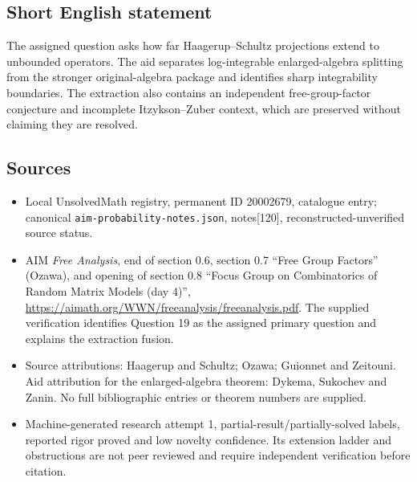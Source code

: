 \documentclass[11pt]{article}
\begin{document}
\subsection{Short English statement}
The assigned question asks how far Haagerup--Schultz projections extend to unbounded operators. The aid separates log-integrable enlarged-algebra splitting from the stronger original-algebra package and identifies sharp integrability boundaries. The extraction also contains an independent free-group-factor conjecture and incomplete Itzykson--Zuber context, which are preserved without claiming they are resolved.
\subsection{Sources}
\begin{itemize}
\item Local UnsolvedMath registry, permanent ID 20002679, catalogue entry; canonical \texttt{aim-probability-notes.json}, notes[120], reconstructed-unverified source status.
\item AIM \emph{Free Analysis}, end of section 0.6, section 0.7 ``Free Group Factors'' (Ozawa), and opening of section 0.8 ``Focus Group on Combinatorics of Random Matrix Models (day 4)'', \url{https://aimath.org/WWN/freeanalysis/freeanalysis.pdf}. The supplied verification identifies Question 19 as the assigned primary question and explains the extraction fusion.
\item Source attributions: Haagerup and Schultz; Ozawa; Guionnet and Zeitouni. Aid attribution for the enlarged-algebra theorem: Dykema, Sukochev and Zanin. No full bibliographic entries or theorem numbers are supplied.
\item Machine-generated research attempt 1, partial-result/partially-solved labels, reported rigor proved and low novelty confidence. Its extension ladder and obstructions are not peer reviewed and require independent verification before citation.
\end{itemize}
\end{document}
